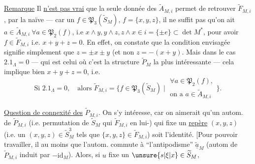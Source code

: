 \uline{Remarque} Il \uline{n'est pas vrai} que la seule donnée des $\widetilde A_{M,i}$ permet de retrouver  $\widetilde F_{M,i}$, par la  naïve --- car  un $f\in\mathfrak P_3(\widetilde S_M)$, $f=\{x,y,z\}$, il ne suffit pas qu'on ait $a\in\widetilde A_{M,i}\ \forall a\in\mathfrak P_2(f)$, i.e $x\wedge y,y\wedge z,z\wedge x\in i=\{\pm e\}\subset\det M^*$, pour avoir $f\in\widetilde F_{M,i}$ i.e. $x+y+z=0$. En effet, on constate que la condition envisagée signifie simplement que $z=\pm x\pm y$ (et non $z=-(x+y)$.
Mais dans le cas $2.1_\Lambda=0$ --- qui est celui où c'est la structure $\widetilde P_M$   la plus intéressante --- cela implique bien $x+y+z=0$, i.e.
\[
 \text{Si }2.1_\Lambda=0,\quad\text{alors }\widetilde F_{M,i}=\bigl\{f\in\mathfrak P_3(\widetilde S_M)\mid
 \substack{\forall a\in\mathfrak P_2(f),\\\text{on a }a\in\widetilde A_{M,i}}\bigr\}.\tag*{(15)}
\]

\uline{Question de connexité des} $\widetilde P_{M,i}$. On s'y intéresse, car on aimerait qu'un autom. de $\widetilde P_{M,i}$ (i.e. permutation de $\widetilde S_M$ qui  $\widetilde F_{M,i}$ en lui-) qui fixe un \uline{repère} $(x,y,z)$ (i.e. un $(x,y,z)\in\widetilde S_M^3$ tels que $\{x,y,z\}\in\widetilde F_{M,i}$) soit l'identité.
[Pour pouvoir travailler, il  au moins que l'autom. commute à ``l'antipodisme'' \deleted{\unsure{$\varepsilon$|$\in$}} $\underline{\widetilde a}_M$ (autom de $\widetilde P_{M,i}$ induit par $-\mathrm{id}_M$). Alors, si $u$ fixe un $\unsure{s|\xi|x}\in\widetilde S_M$,
